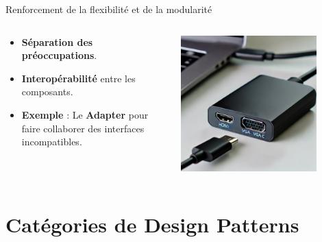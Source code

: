 \documentclass[aspectratio=169]{beamer}
\begin{document}
\begin{frame}{Renforcement de la flexibilité et de la modularité}
    \begin{columns}
        \begin{column}{0.6\textwidth}
            \begin{itemize}
                \item \textbf{Séparation des préoccupations}.
                \item \textbf{Interopérabilité} entre les composants.
                      \pause
                \item \textbf{Exemple} : Le \textbf{Adapter} pour faire collaborer des interfaces incompatibles.
            \end{itemize}
        \end{column}
        \begin{column}{0.4\textwidth}
            \begin{center}
                \includegraphics[width=0.8\textwidth]{pic/adapter_pattern.png}
            \end{center}
        \end{column}
    \end{columns}
\end{frame}


\section{Catégories de Design Patterns}
\end{document}
